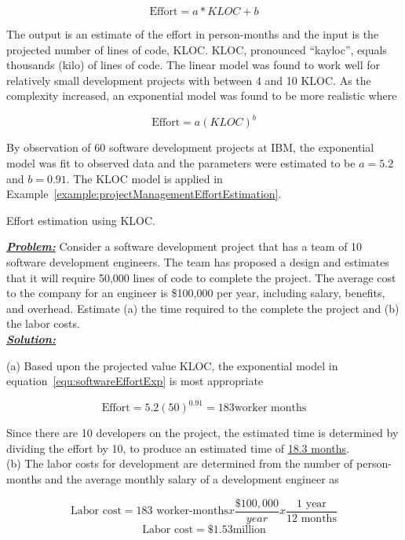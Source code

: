 \begin{equation}
\label{equ:softwareEffortIBM}
\text{Effort} = a * KLOC + b
\end{equation}

The output is an estimate of the effort in person-months and the input
is the projected number of lines of code, KLOC. KLOC, pronounced
``kayloc'', equals thousands (kilo) of lines of code. The linear model
was found to work well for relatively small development projects with
between 4 and 10 KLOC. As the complexity increased, an exponential model
was found to be more realistic where

\begin{equation}
\label{equ:softwareEffortExp}
\text{Effort} = a(KLOC)^b
\end{equation}

By observation of 60 software development projects at IBM, the
exponential model was fit to observed data and the parameters were
estimated to be $a=5.2$ and $b = 0.91$. The KLOC model is
applied in Example~\ref{example:projectManagementEffortEstimation}.

\begin{example}{Effort estimation using KLOC.}
\label{example:projectManagementEffortEstimation}

\emph{\textbf{\ul{Problem:}}} Consider a software development project
that has a team of 10 software development engineers. The team has
proposed a design and estimates that it will require 50,000 lines of
code to complete the project. The average cost to the company for an
engineer is \$100,000 per year, including salary, benefits, and
overhead. Estimate (a) the time required to the complete the project and
(b) the labor costs. \\

\emph{\textbf{\ul{Solution:}}}

(a) Based upon the projected value KLOC, the exponential model in
equation~\ref{equ:softwareEffortExp} is
most appropriate

$$\text{Effort} = 5.2(50)^{0.91} = 183 \text{worker months}$$

Since there are 10 developers on the project, the estimated time is
determined by dividing the effort by 10, to produce an estimated time of
\ul{18.3 months}.\\

(b) The labor costs for development are determined from the number of
person-months and the average monthly salary of a development engineer
as

$$\text{Labor cost} = \text{183 worker-months}  x \frac{\$100,000}{year} x \frac{\text{1 year}}{\text{12 months}}$$
$$\text{Labor cost} = \$1.53 \text{million}$$
\end{example}

